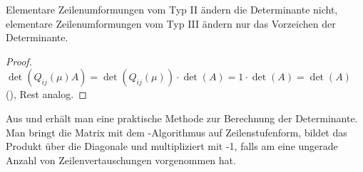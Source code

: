 \begin{conclusion}
	Elementare Zeilenumformungen vom Typ II ändern die Determinante nicht, elementare Zeilenumformungen vom 
	Typ III ändern nur das Vorzeichen der Determinante.
\end{conclusion}
\begin{proof}
	$\det(Q_{ij}(\mu)A)=\det(Q_{ij}(\mu)) \cdot \det(A)= 1\cdot \det(A) = \det(A)$ (), Rest analog.
\end{proof}

\begin{remark}
	Aus  und  erhält man eine praktische Methode zur Berechnung der Determinante. Man bringt die Matrix mit dem -Algorithmus  auf Zeilenstufenform, bildet das Produkt über die Diagonale und multipliziert mit -1, falls am eine ungerade Anzahl von Zeilenvertauschungen vorgenommen hat.
\end{remark}